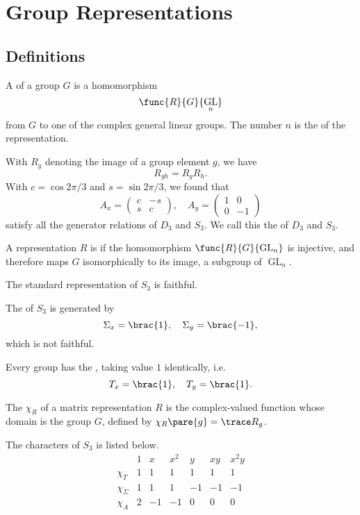 \documentclass[hidelinks]{article}
\DeclareMathOperator{\GL}{GL}
\let\oldgloss\gloss
\def\gloss#1{\textnormal{\textbf{\oldgloss{#1}}}}
\begin{document}
\section{Group Representations} %
\label{sec:group_representations}

\subsection{Definitions} %
\label{sub:definitions}

\begin{definition}
    A  of a group $G$ is a homomorphism
    \[ \func{R}{G}{\GL_n} \]
    from $G$ to one of the complex general linear groups. The number $n$ is the  of the representation.
\end{definition}
With $R_g$ denoting the image of a group element $g$, we have
\[ R_{gh} = R_g R_h. \]
With $c = \cos 2\pi/3$ and $s = \sin 2\pi/3$, we found that
\[ A_x = \begin{pmatrix}
    c & -s \\
    s & c
\end{pmatrix},\quad A_y = \begin{pmatrix}
    1 & 0 \\
    0 & -1
\end{pmatrix} \]
satisfy all the generator relations of $D_3$ and $S_3$. We call this the  of $D_3$ and $S_3$.
\begin{definition}
    A representation $R$ is  if the homomorphism $\func{R}{G}{\GL_n}$ is injective, and therefore maps $G$ isomorphically to its image, a subgroup of $\GL_n$.
\end{definition}
The standard representation of $S_3$ is faithful.
\par
The  of $S_3$ is generated by
\[ \Sigma_x = \brac{1},\quad \Sigma_y = \brac{-1}, \]
which is not faithful.
\par
Every group has the , taking value $1$ identically, i.e.
\[ T_x = \brac{1},\quad T_y = \brac{1}. \]
\begin{definition}
    The  $\chi_R$ of a matrix representation $R$ is the complex-valued function whose domain is the group $G$, defined by $\chi_R\pare{g} = \trace R_g$.
\end{definition}
\begin{ex}
    The characters of $S_3$ is listed below.
    \[ \begin{array}{c|cccccc}
        & 1 & x & x^2 & y & xy & x^2y \\
        \hline
        \chi_T & 1 & 1 & 1 & 1 & 1 & 1 \\
        \chi_\Sigma & 1 & 1 & 1 & -1 & -1 & -1 \\
        \chi_A & 2 & -1 & - 1 & 0 & 0 & 0
    \end{array} \]
\end{ex}
\end{document}
